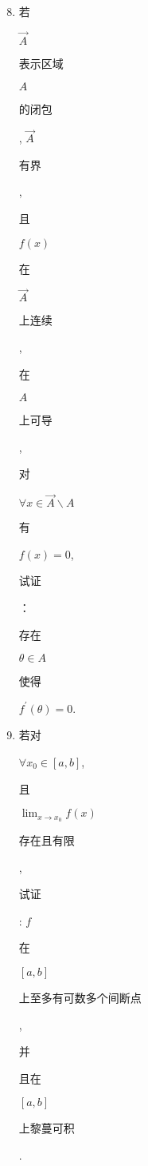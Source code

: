 \documentclass[10pt]{article}
\begin{document}
\begin{enumerate}
  \setcounter{enumi}{7}
  \item \begin{CJK}{UTF8}{mj}若\end{CJK} $\vec{A}$ \begin{CJK}{UTF8}{mj}表示区域\end{CJK} $A$ \begin{CJK}{UTF8}{mj}的闭包\end{CJK}, $\vec{A}$ \begin{CJK}{UTF8}{mj}有界\end{CJK}, \begin{CJK}{UTF8}{mj}且\end{CJK} $f(x)$ \begin{CJK}{UTF8}{mj}在\end{CJK} $\vec{A}$ \begin{CJK}{UTF8}{mj}上连续\end{CJK}, \begin{CJK}{UTF8}{mj}在\end{CJK} $A$ \begin{CJK}{UTF8}{mj}上可导\end{CJK}, \begin{CJK}{UTF8}{mj}对\end{CJK} $\forall x \in \vec{A} \backslash A$ \begin{CJK}{UTF8}{mj}有\end{CJK} $f(x)=0$, \begin{CJK}{UTF8}{mj}试证\end{CJK}：\begin{CJK}{UTF8}{mj}存在\end{CJK} $\theta \in A$ \begin{CJK}{UTF8}{mj}使得\end{CJK} $f^{\prime}(\theta)=0$.

  \item \begin{CJK}{UTF8}{mj}若对\end{CJK} $\forall x_{0} \in[a, b]$, \begin{CJK}{UTF8}{mj}且\end{CJK} $\lim _{x \rightarrow x_{0}} f(x)$ \begin{CJK}{UTF8}{mj}存在且有限\end{CJK}, \begin{CJK}{UTF8}{mj}试证\end{CJK}: $f$ \begin{CJK}{UTF8}{mj}在\end{CJK} $[a, b]$ \begin{CJK}{UTF8}{mj}上至多有可数多个间断点\end{CJK}, \begin{CJK}{UTF8}{mj}并\end{CJK} \begin{CJK}{UTF8}{mj}且在\end{CJK} $[a, b]$ \begin{CJK}{UTF8}{mj}上黎蔓可积\end{CJK}.


\end{enumerate}
\end{document}
